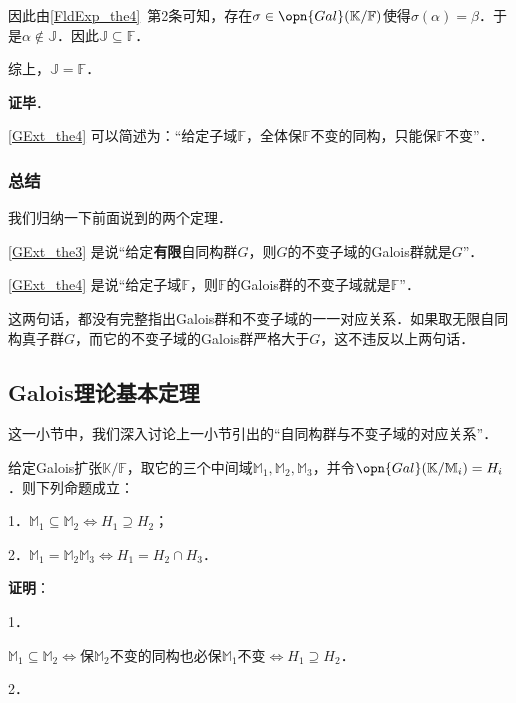 因此由\autoref{FldExp_the4}~第2条可知，存在$\sigma\in\opn{Gal}(\mathbb{K}/\mathbb{F})$使得$\sigma(\alpha)=\beta$．于是$\alpha\not\in \mathbb{J}$．因此$\mathbb{J}\subseteq\mathbb{F}$．

综上，$\mathbb{J}=\mathbb{F}$．

\textbf{证毕}．


\autoref{GExt_the4} 可以简述为：“给定子域$\mathbb{F}$，全体保$\mathbb{F}$不变的同构，只能保$\mathbb{F}$不变”．




\subsubsection{总结}

我们归纳一下前面说到的两个定理．

\autoref{GExt_the3} 是说“给定\textbf{有限}自同构群$G$，则$G$的不变子域的Galois群就是$G$”．

\autoref{GExt_the4} 是说“给定子域$\mathbb{F}$，则$\mathbb{F}$的Galois群的不变子域就是$\mathbb{F}$”．


这两句话，都没有完整指出Galois群和不变子域的一一对应关系．如果取无限自同构真子群$G$，而它的不变子域的Galois群严格大于$G$，这不违反以上两句话．








\subsection{Galois理论基本定理}

这一小节中，我们深入讨论上一小节引出的“自同构群与不变子域的对应关系”．


\begin{lemma}{}
给定Galois扩张$\mathbb{K}/\mathbb{F}$，取它的三个中间域$\mathbb{M}_1, \mathbb{M}_2, \mathbb{M}_3$，并令$\opn{Gal}(\mathbb{K}/\mathbb{M}_i)=H_i$．则下列命题成立：

1．$\mathbb{M}_1\subseteq \mathbb{M}_2 \iff H_1\supseteq H_2$；

2．$\mathbb{M}_1=\mathbb{M}_2\mathbb{M}_3 \iff H_1=H_2\cap H_3$．
\end{lemma}

\textbf{证明}：

1．

$\mathbb{M}_1\subseteq\mathbb{M}_2 \iff$保$\mathbb{M}_2$不变的同构也必保$\mathbb{M}_1$不变$\iff H_1\supseteq H_2$．

2．

